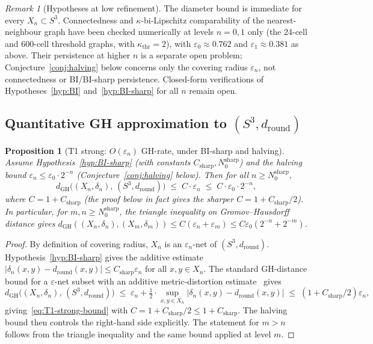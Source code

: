 \documentclass[12pt]{article}
\newtheorem{proposition}[theorem]{Proposition}
\theoremstyle{definition}
\theoremstyle{remark}
\newtheorem{remark}[theorem]{Remark}
\begin{document}
\begin{remark}[Hypotheses at low refinement]\label{rem:low-level}
The diameter bound is immediate for every $X_n \subset S^3$. Connectedness and $\kappa$-bi-Lipschitz comparability of the nearest-neighbour graph have been checked numerically at levels $n = 0, 1$ only (the 24-cell and 600-cell threshold graphs, with $\kappa_{\mathrm{thr}} = 2$), with $\varepsilon_0 \approx 0.762$ and $\varepsilon_1 \approx 0.381$ as above. Their persistence at higher $n$ is a separate open problem; Conjecture~\ref{conj:halving} below concerns only the covering radius $\varepsilon_n$, not connectedness or BI/BI-sharp persistence. Closed-form verifications of Hypotheses~\ref{hyp:BI} and~\ref{hyp:BI-sharp} for all $n$ remain open.
\end{remark}

\subsection{Quantitative GH approximation to $(S^3, d_{\mathrm{round}})$}

\begin{proposition}[T1 strong: $O(\varepsilon_n)$ GH-rate, under BI-sharp and halving]\label{prop:T1-strong}
Assume Hypothesis~\ref{hyp:BI-sharp} (with constants $C_{\mathrm{sharp}}, N_0^{\mathrm{sharp}}$) and the halving bound $\varepsilon_n \leq \varepsilon_0 \cdot 2^{-n}$ (Conjecture~\ref{conj:halving} below). Then for all $n \geq N_0^{\mathrm{sharp}}$,
\begin{equation}\label{eq:T1-strong-bound}
    d_{\mathrm{GH}}\!\bigl((X_n, \delta_n),\, (S^3, d_{\mathrm{round}})\bigr) \;\leq\; C \cdot \varepsilon_n \;\leq\; C \cdot \varepsilon_0 \cdot 2^{-n},
\end{equation}
where $C = 1 + C_{\mathrm{sharp}}$ (the proof below in fact gives the sharper $C = 1 + C_{\mathrm{sharp}}/2$). In particular, for $m, n \geq N_0^{\mathrm{sharp}}$, the triangle inequality on Gromov--Hausdorff distance gives $d_{\mathrm{GH}}((X_n, \delta_n), (X_m, \delta_m)) \leq C(\varepsilon_n + \varepsilon_m) \leq C \varepsilon_0 (2^{-n} + 2^{-m})$.
\end{proposition}

\begin{proof}
By definition of covering radius, $X_n$ is an $\varepsilon_n$-net of $(S^3, d_{\mathrm{round}})$. Hypothesis~\ref{hyp:BI-sharp} gives the additive estimate $|\delta_n(x,y) - d_{\mathrm{round}}(x,y)| \leq C_{\mathrm{sharp}} \varepsilon_n$ for all $x, y \in X_n$. The standard GH-distance bound for a $\varepsilon$-net subset with an additive metric-distortion estimate~\citep[Prop.\ 7.3.28]{BBI2001} gives
\[
    d_{\mathrm{GH}}\!\bigl((X_n, \delta_n),\, (S^3, d_{\mathrm{round}})\bigr) \;\leq\; \varepsilon_n + \tfrac{1}{2} \cdot \sup_{x,y \in X_n} |\delta_n(x,y) - d_{\mathrm{round}}(x,y)| \;\leq\; (1 + C_{\mathrm{sharp}}/2) \varepsilon_n,
\]
giving~\eqref{eq:T1-strong-bound} with $C = 1 + C_{\mathrm{sharp}}/2 \leq 1 + C_{\mathrm{sharp}}$. The halving bound then controls the right-hand side explicitly. The statement for $m > n$ follows from the triangle inequality and the same bound applied at level $m$.
\end{proof}
\end{document}
